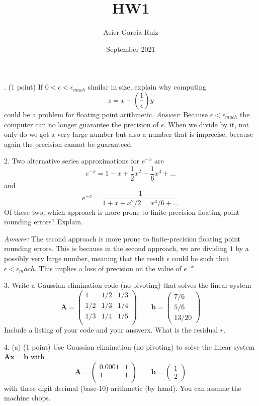 \documentclass{article}
\title{HW1}
\author{Asier Garcia Ruiz }
\date{September 2021}
\begin{document}
    . (1 point) If $0 < \epsilon <\epsilon_{mach}$ similar in size, explain why computing 
    $$z = x + \left(\frac{1}{\epsilon}\right)y$$ could be a problem for floating point arithmetic.\vspace{0.5cm}
    \textit{Answer}: Because $\epsilon < \epsilon_{mach}$ the computer can no longer guarantee
    the precision of $\epsilon$. When we divide by it, not only do we get a very large number
    but also a number that is imprecise, because again the precision cannot be guaranteed.

    \vspace{1cm}
    2. Two alternative series approximations for $e^{-x}$ are
    $$e^{-x} = 1 - x + \frac{1}{2}x^2 - \frac{1}{6}x^3 + ...$$ and 
    $$e^{-x} = \frac{1}{1 + x + x^2/2 = x^3/6 + ...}$$
    Of these two, which approach is more prone to finite-precision floating point rounding errors?
    Explain.
    
    \vspace{0.5cm}
    \textit{Answer:} The second approach is more prone to finite-precision floating point rounding
    errors. This is because in the second approach, we are dividing $1$ by a possibly very large
    number, meaning that the result $\epsilon$ could be such that $\epsilon < \epsilon_mach$. This
    implies a loss of precision on the value of $e^{-x}$.

    \vspace{1cm}
    3. Write  a  Gaussian  elimination  code  (no  pivoting)  that  solves  the  linear  system
    $$\bm{A}=\begin{pmatrix}
        1 & 1/2 &  1/3 \\
        1/2 & 1/3 & 1/4 \\
        1/3 & 1/4 & 1/5 \\
    \end{pmatrix}
    \qquad \bm{b} = \begin{pmatrix}
        7/6 \\ 5/6\\ 13/20
    \end{pmatrix}$$
    Include a listing of your code and your answerx.  What is the residual $r$.

    \vspace{0.5cm}
    4. (a) (1 point) Use Gaussian elimination (no pivoting) to solve the linear system $\bm{A}\bm{x}=\bm{b}$
    with $$\bm{A}=\begin{pmatrix}
        0.0001 & 1 \\
        1 & 1 \\
    \end{pmatrix} \qquad \bm{b} = \begin{pmatrix}
        1 \\ 2
    \end{pmatrix}$$
    with three digit decimal (base-10) arithmetic (by hand).  You can assume the machine chops.
\end{document}
